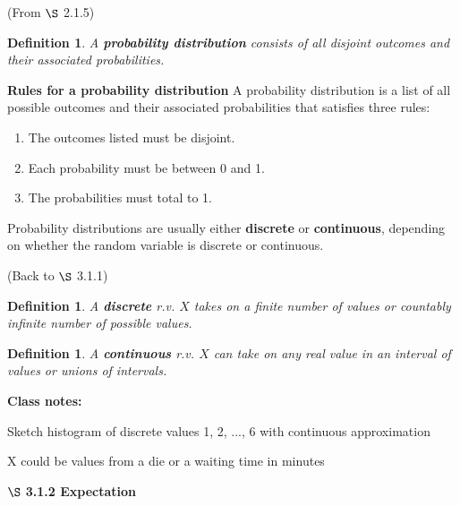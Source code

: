 \documentclass[12pt]{amsart}
\newtheorem{definition}[theorem]{Definition}
\begin{document}
{(From $\S$ 2.1.5)
\begin{definition} A \textbf{probability distribution} consists of all disjoint outcomes and their associated probabilities.
\end{definition}

\textbf{Rules for a probability distribution} \newline
A probability distribution is a list of all possible outcomes and their associated probabilities that satisfies three rules: 
\begin{enumerate}
\setlength{\itemsep}{0mm}
\item The outcomes listed must be disjoint.
\item Each probability must be between 0 and 1.
\item The probabilities must total to 1. \vspace{1mm}
\end{enumerate}

\vspace{0.5cm}

Probability distributions are usually either \textbf{discrete} or \textbf{continuous}, depending on whether the random variable is discrete or continuous.

\vspace{1cm}

(Back to $\S$ 3.1.1)
\begin{definition} A \textbf{discrete} r.v. $X$ takes on a finite number of values or countably infinite number of possible values.
\end{definition}

\begin{definition} A \textbf{continuous} r.v. $X$ can take on any real value in an interval of values or unions of intervals.\end{definition}


\vspace{2cm}
\color{blue}
\textbf{Class notes:}

Sketch histogram of discrete values 1, 2, ..., 6 with continuous approximation

X could be values from a die or a waiting time in minutes

\color{black}

\newpage

$\S$ \textbf{3.1.2 Expectation}

\vspace{.5cm}

}
\end{document}
